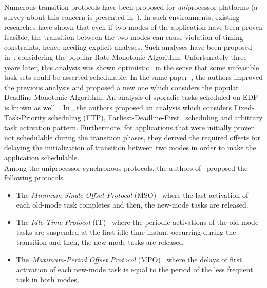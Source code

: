 \documentclass{article}
\newtheorem{validity test}{Validity Test}
\begin{document}
Numerous transition protocols have been proposed for \emph{uni}processor platforms (a survey about this concern is presented in~\cite{JoAlfons:04}). In such environments, existing researches \cite{JoAlfons:04, Henia:07, Pedro:98} have shown that even if two modes of the application have been proven feasible, the transition between the two modes can cause violation of timing constraints, hence needing explicit analyses. Such analyses have been proposed in~\cite{Sha:89}, considering the popular Rate Monotonic Algorithm. Unfortunately three years later, this analysis was shown optimistic~\cite{Tindell:92} in the sense that some unfeasible task sets could be asserted schedulable. In the same paper~\cite{Tindell:92}, the authors improved the previous analysis and proposed a new one which considers the popular Deadline Monotonic Algorithm. An analysis of sporadic tasks scheduled on EDF is known as well~\cite{Andersson:08}. In \cite{Stoimenov:09}, the authors proposed an analysis which considers Fixed-Task-Priority scheduling (FTP), Earliest-Deadline-First~\cite{Liu:73} scheduling and arbitrary task activation pattern. Furthermore, for applications that were initially proven not schedulable during the transition phases, they derived the required offsets for delaying the initialization of transition between two modes in order to make the application schedulable. \\
\noindent Among the uniprocessor synchronous protocols, the authors of~\cite{Bailey:93, Tindell:96, JoAlfons:04} proposed the following protocols.
\begin{itemize}
\renewcommand{\labelitemi}{}
\item The \emph{Minimum Single Offset Protocol} (MSO)~\cite{JoAlfons:04} where the last activation of each old-mode task completes and then, the new-mode tasks are released. 

\item The \emph{Idle Time Protocol} (IT)~\cite{Tindell:96} where the periodic activations of the old-mode tasks are suspended at the first idle time-instant occurring during the transition and then, the new-mode tasks are released.

\item The~\emph{Maximum-Period Offset Protocol} (MPO)~\cite{Bailey:93} where the delays of first activation of each new-mode task is equal to the period of the less frequent task in both modes, \end{itemize}
\end{document}
